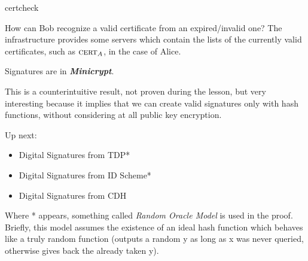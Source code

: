 \begin{cryptosequence}
    {certcheck}
    {}



    \cseqdelay


    \cseqdelay

    
    \cseqdelay


\end{cryptosequence}

How can Bob recognize a valid certificate from an expired/invalid one? The infrastructure provides some servers which contain the lists of the currently valid certificates, such as $\textsc{cert}_A$, in the case of Alice.

\begin{theorem}
    Signatures are in \textit{\textbf{Minicrypt}}.
\end{theorem}

This is a counterintuitive result, not proven during the lesson, but very interesting because it implies that we can create valid signatures only with hash functions, without considering at all public key encryption.


Up next:
\begin{itemize}
    \item Digital Signatures from TDP*
    \item Digital Signatures from ID Scheme*
    \item Digital Signatures from CDH
\end{itemize}

Where * appears, something called \textit{Random Oracle Model} is used in the proof. Briefly, this model assumes the existence of an ideal hash function which behaves like a truly random function (outputs a random y as long as x was never queried, otherwise gives back the already taken y).
